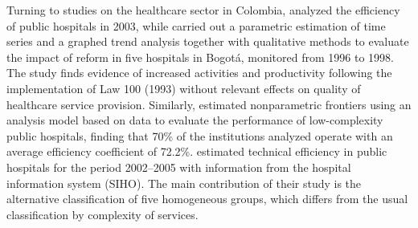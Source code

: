 \documentclass[11pt,a4paper,oneside]{article}
\begin{document}

Turning to studies on the healthcare sector in Colombia, \cite{Sarmiento:2006ts} analyzed the efficiency of public hospitals in 2003, while \cite{McPake:2003fe} carried out a parametric estimation of time series and a graphed trend analysis together with qualitative methods to evaluate the impact of reform in five hospitals in Bogot\'a, monitored from 1996 to 1998. The study finds evidence of increased activities and productivity following the implementation of Law 100 (1993) without relevant effects on quality of healthcare service provision. Similarly, \cite{PinzonMartinez:2003tf} estimated nonparametric frontiers using an analysis model based on data to evaluate the performance of low-complexity public hospitals, finding that 70\% of the institutions analyzed operate with an average efficiency coefficient of 72.2\%. \cite{Tamayo:2007bg} estimated technical efficiency in public hospitals for the period 2002--2005 with information from the hospital information system (SIHO). The main contribution of their study is the alternative classification of five homogeneous groups, which differs from the usual classification by complexity of services.
\end{document}
